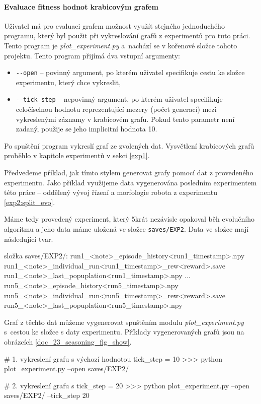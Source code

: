 \paragraph{Evaluace fitness hodnot krabicovým grafem}
Uživatel má pro evaluaci grafem možnost využít stejného jednoduchého programu,
který byl použit při vykreslování grafů z experimentů pro tuto práci. Tento
program je \emph{plot\_experiment.py} a~nachází se v kořenové složce
tohoto projektu. Tento program přijímá dva vstupní argumenty: 
\begin{itemize}
    \item \texttt{-{}-open} -- povinný argument, po kterém uživatel specifikuje
        cestu ke složce experimentu, který chce vykreslit,
    \item \texttt{-{}-tick\_step} -- nepovinný argument, po kterém uživatel specifikuje
        celočíselnou hodnotu reprezentující mezery (počet generací) mezi
        vykreslenými záznamy v krabicovém grafu. Pokud tento parametr není
        zadaný, použije se jeho implicitní hodnota 10.
\end{itemize}
Po spuštění program vykreslí graf ze zvolených dat. Vysvětlení krabicových
grafů proběhlo v kapitole experimentů v sekci \ref{exp1}.

Předvedeme příklad, jak tímto stylem generovat grafy pomocí dat z provedeného
experimentu. Jako příklad využijeme data vygenerována posledním experimentem
této práce -- oddělený vývoj řízení a morfologie robota z experimentu
\ref{exp2:split_evo}. 

Máme tedy provedený experiment, který 5krát nezávisle opakoval běh evolučního
algoritmu a jeho data máme uložená ve složce \texttt{saves/EXP2}. Data ve
složce mají následující tvar.
\begin{code}
 složka saves/EXP2/:
    run1_<note>_episode_history<run1_timestamp>.npy
    run1_<note>_individual_run<run1_timestamp>_rew<reward>.save
    run1_<note>_last_popuplation<run1_timestamp>.npy
    ...
    run5_<note>_episode_history<run5_timestamp>.npy
    run5_<note>_individual_run<run5_timestamp>_rew<reward>.save
    run5_<note>_last_popuplation<run5_timestamp>.npy
\end{code}
Graf z těchto dat můžeme vygenerovat spuštěním modulu
\emph{plot\_experiment.py} s~cestou ke složce s daty experimentu. Příklady
vygenerovaných grafů jsou na obrázcích \ref{doc_23_seasoning_fig_show}.

\begin{code}
# 1. vykreslení grafu s výchozí hodnotou tick_step = 10
>>> python plot_experiment.py --open saves/EXP2/ 

# 2. vykreslení grafu s tick_step = 20
>>> python plot_experiment.py --open saves/EXP2/ --tick_step 20
\end{code}


